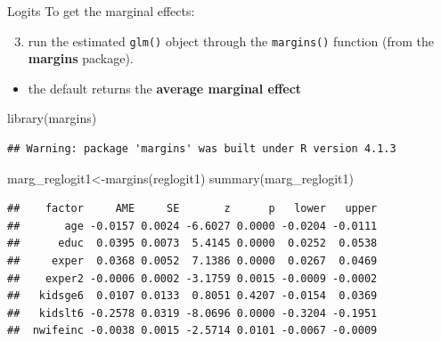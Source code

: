 \documentclass[
  ignorenonframetext,
]{beamer}
\newenvironment{Shaded}{\begin{snugshade}}{\end{snugshade}}
\newcommand{\FunctionTok}[1]{\textcolor[rgb]{0.00,0.00,0.00}{#1}}
\newcommand{\NormalTok}[1]{#1}
\newcommand{\OtherTok}[1]{\textcolor[rgb]{0.56,0.35,0.01}{#1}}
\providecommand{\tightlist}{%
  \setlength{\itemsep}{0pt}\setlength{\parskip}{0pt}}
\begin{document}
\begin{frame}[fragile]{Logits}
\protect\hypertarget{logits-7}{}
To get the marginal effects:

\begin{enumerate}
[1)]
\setcounter{enumi}{2}
\tightlist
\item
  run the estimated \texttt{glm()} object through the \texttt{margins()}
  function (from the \textbf{margins} package).
\end{enumerate}

\begin{itemize}
\tightlist
\item
  the default returns the \textbf{average marginal effect}
\end{itemize}

\tiny

\begin{Shaded}
\begin{Highlighting}[]
\FunctionTok{library}\NormalTok{(margins)}
\end{Highlighting}
\end{Shaded}

\begin{verbatim}
## Warning: package 'margins' was built under R version 4.1.3
\end{verbatim}

\begin{Shaded}
\begin{Highlighting}[]
\NormalTok{marg\_reglogit1}\OtherTok{\textless{}{-}}\FunctionTok{margins}\NormalTok{(reglogit1)}
\FunctionTok{summary}\NormalTok{(marg\_reglogit1)}
\end{Highlighting}
\end{Shaded}

\begin{verbatim}
##    factor     AME     SE       z      p   lower   upper
##       age -0.0157 0.0024 -6.6027 0.0000 -0.0204 -0.0111
##      educ  0.0395 0.0073  5.4145 0.0000  0.0252  0.0538
##     exper  0.0368 0.0052  7.1386 0.0000  0.0267  0.0469
##    exper2 -0.0006 0.0002 -3.1759 0.0015 -0.0009 -0.0002
##   kidsge6  0.0107 0.0133  0.8051 0.4207 -0.0154  0.0369
##   kidslt6 -0.2578 0.0319 -8.0696 0.0000 -0.3204 -0.1951
##  nwifeinc -0.0038 0.0015 -2.5714 0.0101 -0.0067 -0.0009
\end{verbatim}
\end{frame}
\end{document}

